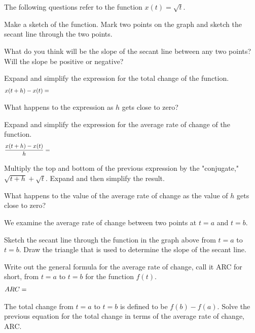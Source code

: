 \begin{problem}
    \item The following questions refer to the function $x(t)=\sqrt{t}$.
      \begin{subproblem}
        \item  Make a sketch of the function. Mark two points on the
          graph and sketch the secant line through the two points.
          \vfill
        \item What do you think will be the slope of the secant line
          between any two points? Will the slope be positive or negative?
          \vspace{1em}
        \item Expand and simplify the expression for the total change
          of the function.
          \begin{eqnarray*}
            x(t+h)-x(t) & = & \hskip \textwidth
          \end{eqnarray*}
        \item What happens to the expression as $h$ gets close to zero?
        \item Expand and simplify the expression for the average rate
          of change of the function.
        \begin{eqnarray*}
          \frac{x(t+h)-x(t)}{h} & = & \hskip \textwidth
        \end{eqnarray*}
        \vfill
        \item Multiply the top and bottom of the previous expression
          by the "conjugate," ${\displaystyle \sqrt{t+h}+\sqrt{t}}$.
          Expand and then simplify the result.
          \vfill
      \item What happens to the value of the average rate of change as
        the value of $h$ gets close to zero?
        \vspace{3em}
      \end{subproblem}

      \clearpage

    \item We examine the average rate of change between two points at
      $t=a$ and $t=b$.

      \scalebox{0.7}{}

      \begin{subproblem}
      \item Sketch the secant line through the function in the graph above
        from $t=a$ to $t=b$. Draw the triangle that is used to determine
        the slope of the secant line.
      \item Write out the general formula for the average rate of change,
        call it ARC for short, from $t=a$ to $t=b$ for the function
        $f(t)$.
        \begin{eqnarray*}
          ARC & = & \hskip \textwidth
        \end{eqnarray*}
        \vspace{2em}
      \item The total change from $t=a$ to $t=b$ is defined to be
        $f(b)-f(a)$. Solve the previous equation for the total change in
        terms of the average rate of change, ARC.
        \vfill
      \end{subproblem}


\end{problem}
